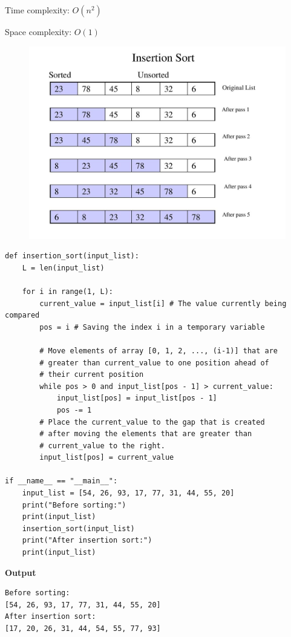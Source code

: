 \documentclass[a4paper,11pt]{book}
\begin{document}
\noindent Time complexity: $O(n^2)$

\noindent Space complexity: $O(1)$

\begin{figure}[ht]
	\centering
	\includegraphics[scale=1.2]{code/sort/pic/picinsertion.jpg}
\end{figure}

\newpage
\begin{lstlisting}
def insertion_sort(input_list):
    L = len(input_list)
    
    for i in range(1, L):
        current_value = input_list[i] # The value currently being compared
        pos = i # Saving the index i in a temporary variable
        
        # Move elements of array [0, 1, 2, ..., (i-1)] that are 
        # greater than current_value to one position ahead of 
        # their current position
        while pos > 0 and input_list[pos - 1] > current_value:
            input_list[pos] = input_list[pos - 1]
            pos -= 1
        # Place the current_value to the gap that is created 
        # after moving the elements that are greater than 
        # current_value to the right.
        input_list[pos] = current_value

if __name__ == "__main__": 
    input_list = [54, 26, 93, 17, 77, 31, 44, 55, 20]
    print("Before sorting:")
    print(input_list)
    insertion_sort(input_list)
    print("After insertion sort:")
    print(input_list)
\end{lstlisting}
\textbf{Output}
\begin{lstlisting}
Before sorting:
[54, 26, 93, 17, 77, 31, 44, 55, 20]
After insertion sort:
[17, 20, 26, 31, 44, 54, 55, 77, 93]
\end{lstlisting}
\end{document}
